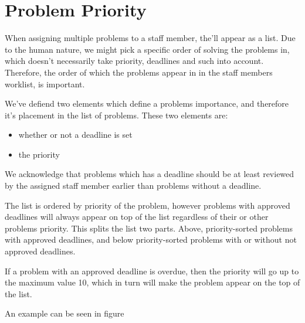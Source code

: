 \section{Problem Priority}
\label{sec:problem_priority}

When assigning multiple problems to a staff member, the'll appear as a list. Due to the human nature, we might pick a specific order of solving the problems in, which doesn't necessarily take priority, deadlines and such into account. Therefore, the order of which the problems appear in in the staff members worklist, is important.

We've defiend two elements which define a problems importance, and therefore it's placement in the list of problems. These two elements are:

\begin{itemize}
	\item whether or not a deadline is set
	\item the priority
\end{itemize}

We acknowledge that problems which has a deadline should be at least reviewed by the assigned staff member earlier than problems without a deadline.

The list is ordered by priority of the problem, however problems with approved deadlines will always appear on top of the list regardless of their or other problems priority. This splits the list two parts. Above, priority-sorted problems with approved deadlines, and below priority-sorted problems with or without not approved deadlines. 

If a problem with an approved deadline is overdue, then the priority will go up to the maximum value 10, which in turn will make the problem appear on the top of the list.

An example can be seen in figure  
